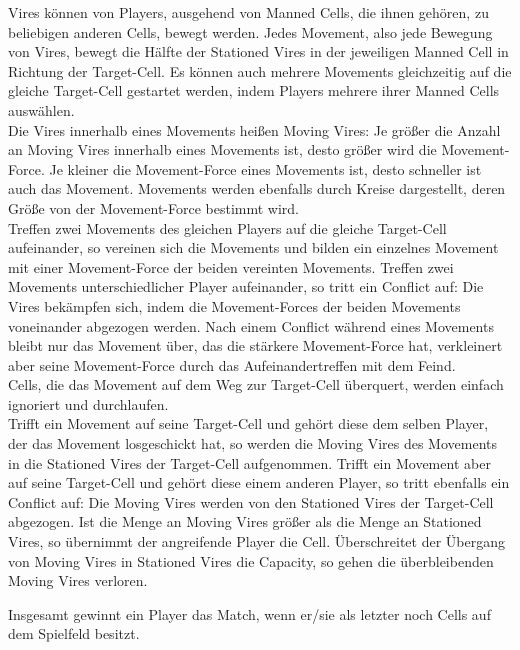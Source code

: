 Vires können von Players, ausgehend von Manned Cells, die ihnen gehören, zu beliebigen anderen Cells, bewegt werden. 
Jedes Movement, also jede Bewegung von Vires, bewegt die Hälfte der Stationed Vires in der jeweiligen Manned Cell in Richtung der Target-Cell.
Es können auch mehrere Movements gleichzeitig auf die gleiche Target-Cell gestartet werden, indem Players mehrere ihrer Manned Cells auswählen. \\
Die Vires innerhalb eines Movements heißen Moving Vires: Je größer die Anzahl an Moving Vires innerhalb eines Movements ist, desto größer wird die Movement-Force.
Je kleiner die Movement-Force eines Movements ist, desto schneller ist auch das Movement.
Movements werden ebenfalls durch Kreise dargestellt, deren Größe von der Movement-Force bestimmt wird. \\
Treffen zwei Movements des gleichen Players auf die gleiche Target-Cell aufeinander, so vereinen sich die Movements und bilden ein einzelnes Movement mit einer Movement-Force der beiden vereinten Movements.
Treffen zwei Movements unterschiedlicher Player aufeinander, so tritt ein Conflict auf: Die Vires bekämpfen sich, indem die Movement-Forces der beiden Movements voneinander abgezogen werden. Nach einem Conflict während eines Movements bleibt nur das Movement über, das die stärkere Movement-Force hat, verkleinert aber seine Movement-Force durch das Aufeinandertreffen mit dem Feind. \\
Cells, die das Movement auf dem Weg zur Target-Cell überquert, werden einfach ignoriert und durchlaufen. \\
Trifft ein Movement auf seine Target-Cell und gehört diese dem selben Player, der das Movement losgeschickt hat, so werden die Moving Vires des Movements in die Stationed Vires der Target-Cell aufgenommen.
Trifft ein Movement aber auf seine Target-Cell und gehört diese einem anderen Player, so tritt ebenfalls ein Conflict auf: Die Moving Vires werden von den Stationed Vires der Target-Cell abgezogen. Ist die Menge an Moving Vires größer als die Menge an Stationed Vires, so übernimmt der angreifende Player die Cell.
Überschreitet der Übergang von Moving Vires in Stationed Vires die Capacity, so gehen die überbleibenden Moving Vires verloren.

Insgesamt gewinnt ein Player das Match, wenn er/sie als letzter noch Cells auf dem Spielfeld besitzt.